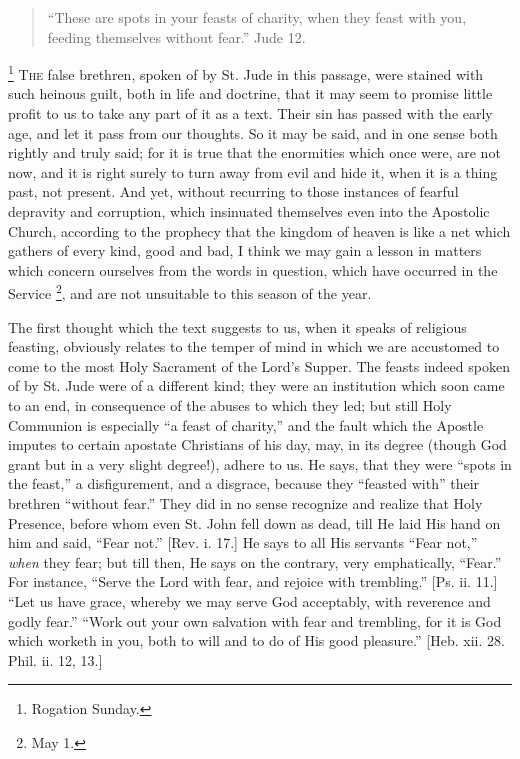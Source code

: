 
\begin{quote}

``These are spots in your feasts of charity, when they feast
with you, feeding themselves without fear.'' Jude 12.

\end{quote}

\footnote{Rogation Sunday.} T\textsc{he} false brethren, spoken of by St. Jude in this passage, were
stained with such heinous guilt, both in life and doctrine, that it
may seem to promise little profit to us to take any part of it as a
text. Their sin has passed with the early age, and let it pass from
our thoughts. So it may be said, and in one sense both rightly and
truly said; for it is true that the enormities which once were, are
not now, and it is right surely to turn away from evil and hide it,
when it is a thing past, not present. And yet, without recurring to
those instances of fearful depravity and corruption, which insinuated
themselves even into the Apostolic Church, according to the prophecy
that the kingdom of heaven is like a net which gathers of every kind,
good and bad, I think we may gain a lesson in matters which concern
ourselves from the words in question, which have occurred in the
Service \footnote{May 1.}, and are not unsuitable to this season of the year.

The first thought which the text suggests to us, when it speaks of
religious feasting, obviously relates to the temper of mind in which
we are accustomed to come to the most Holy Sacrament of the Lord's
Supper. The feasts indeed spoken of by St. Jude were of a different
kind; they were an institution which soon came to an end, in
consequence of the abuses to which they led; but still Holy Communion
is especially ``a feast of charity,'' and the fault which the
Apostle imputes to certain apostate Christians of his day, may, in its
degree (though God grant but in a very slight degree!), adhere to us.
He says, that they were ``spots in the feast,'' a
disfigurement, and a disgrace, because they ``feasted with''
their brethren ``without fear.'' They did in no sense
recognize and realize that Holy Presence, before whom even St. John
fell down as dead, till He laid His hand on him and said, ``Fear
not.'' [Rev. i. 17.] He says to all His servants ``Fear
not,'' \emph{when} they fear; but till then, He says on the
contrary, very emphatically, ``Fear.'' For instance,
``Serve the Lord with fear, and rejoice with trembling.'' [Ps.
ii. 11.] ``Let us have grace, whereby we may serve God acceptably,
with reverence and godly fear.'' ``Work out your own salvation
with fear and trembling, for it is God which worketh in you, both to
will and to do of His good pleasure.'' [Heb. xii. 28. Phil. ii.
12, 13.]

